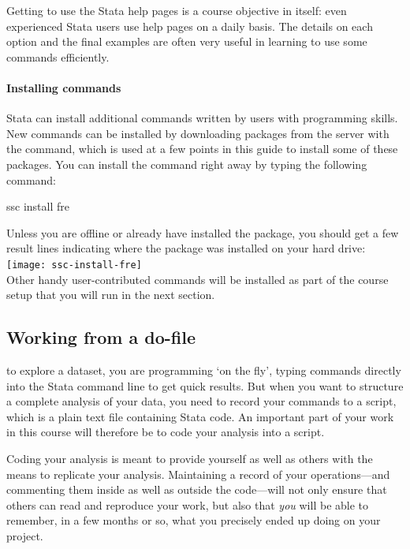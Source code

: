     Getting to use the Stata help pages is a course objective in itself: even experienced Stata users use help pages on a daily basis. The details on each option and the final examples are often very useful in learning to use some commands efficiently.%

%
%
\paragraph{Installing commands}%

Stata can install additional commands written by users with programming skills. New commands can be installed by downloading packages from the \SSC server with the  command, which is used at a few points in this guide to install some of these packages. You can install the  command right away by typing the following command:%
	
\begin{docspec}
	ssc install fre
\end{docspec}
	
Unless you are offline or already have installed the  package, you should get a few result lines indicating where the package was installed on your hard drive:\\[1em]%
	
\texttt{[image: ssc-install-fre]}\\[1em]
	
Other handy user-contributed commands will be installed as part of the course setup that you will run in the next section.%

%
%
\subsection{Working from a do-file}%
	\label{sec:do-files}%
%
%

 to explore a dataset, you are programming `on the fly', typing commands directly into the Stata command line to get quick results. But when you want to structure a complete analysis of your data, you need to record your commands to a script, which is a plain text file containing Stata code. An important part of your work in this course will therefore be to code your analysis into a script.%

Coding your analysis is meant to provide yourself as well as others with the means to replicate your analysis. Maintaining a record of your operations—and commenting them inside as well as outside the code—will not only ensure that others can read and reproduce your work, but also that \emph{you} will be able to remember, in a few months or so, what you precisely ended up doing on your project.%

